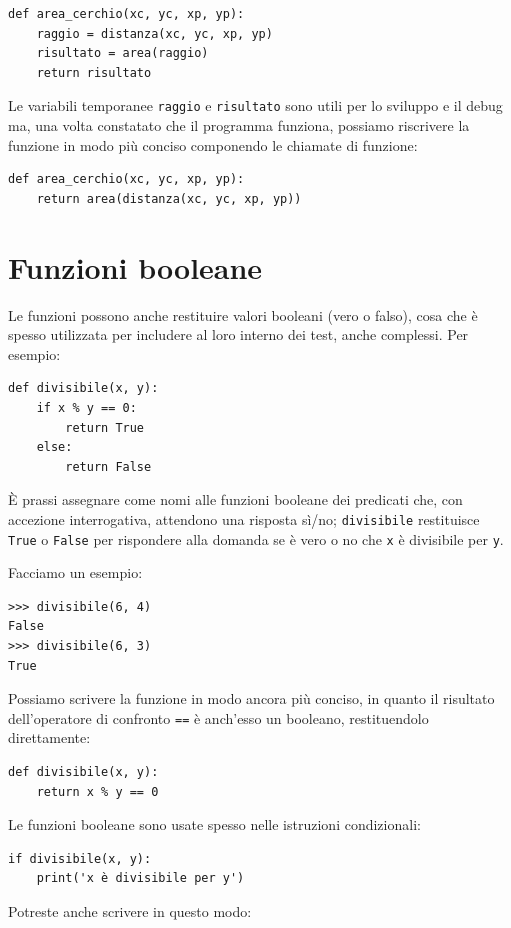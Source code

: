 \documentclass[10pt]{book}
\begin{document}
\begin{verbatim}
def area_cerchio(xc, yc, xp, yp):
    raggio = distanza(xc, yc, xp, yp)
    risultato = area(raggio)
    return risultato
\end{verbatim}
%
Le variabili temporanee {\tt raggio} e {\tt risultato} sono utili per lo sviluppo
e il debug ma, una volta constatato che il programma funziona, possiamo riscrivere la funzione in modo più conciso componendo le chiamate di funzione:

\begin{verbatim}
def area_cerchio(xc, yc, xp, yp):
    return area(distanza(xc, yc, xp, yp))
\end{verbatim}
%

\section{Funzioni booleane}
\label{boolean}

Le funzioni possono anche restituire valori booleani (vero o falso), cosa che è spesso utilizzata per includere al loro interno dei test, anche complessi.  
Per esempio:

\begin{verbatim}
def divisibile(x, y):
    if x % y == 0:
        return True
    else:
        return False
\end{verbatim}
%
È prassi assegnare come nomi alle funzioni booleane dei predicati che, con accezione interrogativa, attendono una risposta sì/no; \verb"divisibile" restituisce {\tt True} o {\tt False} per rispondere alla domanda se è vero o no che {\tt x} è divisibile per {\tt y}.

Facciamo un esempio:

\begin{verbatim}
>>> divisibile(6, 4)
False
>>> divisibile(6, 3)
True
\end{verbatim}
%
Possiamo scrivere la funzione in modo ancora più conciso, in quanto il risultato dell'operatore di confronto {\tt ==} è anch'esso un booleano, restituendolo direttamente:

\begin{verbatim}
def divisibile(x, y):
    return x % y == 0
\end{verbatim}
%
Le funzioni booleane sono usate spesso nelle istruzioni condizionali:

\begin{verbatim}
if divisibile(x, y):
    print('x è divisibile per y')
\end{verbatim}
%
Potreste anche scrivere in questo modo:
\end{document}
